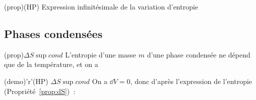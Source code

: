 \documentclass[../../main/main.tex]{subfiles}
\begin{document}
\begin{tcb}[label=prop:dS, sidebyside](prop){(HP)
			Expression infinitésimale de la variation d'entropie}
	\vspace{-15pt}
	\tcblower
	\vspace{-15pt}
\end{tcb}

\subsection{Phases condensées}
\begin{tcbraster}[raster equal height=rows, raster columns=2]
	\begin{tcb*}(prop){$\Delta{S}\sup{cond}$}
		L'entropie d'une masse $m$ d'une phase condensée ne dépend que
		de la température, et on a
		\psw{%
			\[
				S(T) = mc \ln \frac{T}{T\ind{ref}} + S\ind{ref}
				\boxed{\Delta{S} = mc \ln \frac{T_f}{T_i}}
			\]
		}%
		\vspace{-15pt}
	\end{tcb*}
	\begin{tcb}(demo)'r'{(HP) $\Delta{S}\sup{cond}$}
		On a $\dd{V} = 0$, donc d'après l'expression de l'entropie
		(Propriété~\ref{prop:dS})~:
		\vspace{-15pt}
	\end{tcb}
\end{tcbraster}
\end{document}
